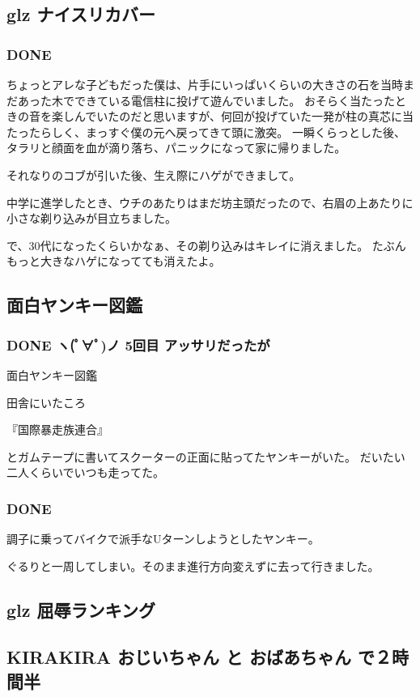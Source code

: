 \documentclass[11pt]{article}
\begin{document}
\subsection{glz ナイスリカバー}
\label{sec-113_1}
\subsubsection{\textbf{DONE}}
\label{sec-113_1_1}

ちょっとアレな子どもだった僕は、片手にいっぱいくらいの大きさの石を当時まだあった木でできている電信柱に投げて遊んでいました。
おそらく当たったときの音を楽しんでいたのだと思いますが、何回が投げていた一発が柱の真芯に当たったらしく、まっすぐ僕の元へ戻ってきて頭に激突。
一瞬くらっとした後、タラリと顔面を血が滴り落ち、パニックになって家に帰りました。

それなりのコブが引いた後、生え際にハゲができまして。

中学に進学したとき、ウチのあたりはまだ坊主頭だったので、右眉の上あたりに小さな剃り込みが目立ちました。

で、30代になったくらいかなぁ、その剃り込みはキレイに消えました。
たぶんもっと大きなハゲになってても消えたよ。
\subsection{面白ヤンキー図鑑}
\label{sec-113_2}
\subsubsection{\textbf{DONE} ヽ(ﾟ∀ﾟ)ノ 5回目 アッサリだったが}
\label{sec-113_2_1}

面白ヤンキー図鑑

田舎にいたころ

『国際暴走族連合』

とガムテープに書いてスクーターの正面に貼ってたヤンキーがいた。
だいたい二人くらいでいつも走ってた。
\subsubsection{\textbf{DONE}}
\label{sec-113_2_2}

調子に乗ってバイクで派手なUターンしようとしたヤンキー。

ぐるりと一周してしまい。そのまま進行方向変えずに去って行きました。
\subsection{glz 屈辱ランキング}
\label{sec-113_3}
\subsection{KIRAKIRA おじいちゃん と おばあちゃん で２時間半}
\label{sec-113_4}
\end{document}
